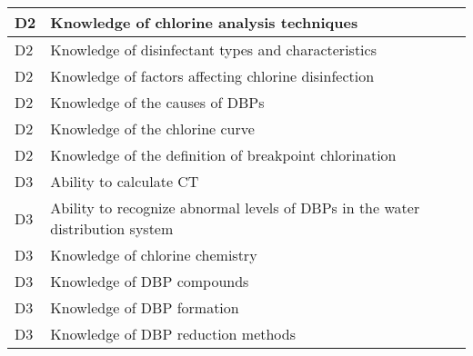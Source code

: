 \begin{table}[H]
\begin{tabular}{| m{1cm} | m{15cm} |}
D2 & Knowledge of chlorine   analysis techniques                                          \\ \hline
D2 & Knowledge of   disinfectant types and characteristics                                \\ \hline
D2 & Knowledge of factors   affecting chlorine disinfection                               \\ \hline
D2 & Knowledge of the   causes of DBPs                                                    \\ \hline
D2 & Knowledge of the   chlorine curve                                                    \\ \hline
D2 & Knowledge of the   definition of breakpoint chlorination                             \\ \hline
D3 & Ability to calculate   CT                                                            \\ \hline
D3 & Ability to recognize   abnormal levels of DBPs in the water distribution system      \\ \hline
D3 & Knowledge of chlorine   chemistry                                                    \\ \hline
D3 & Knowledge of DBP   compounds                                                         \\ \hline
D3 & Knowledge of DBP   formation                                                         \\ \hline
D3 & Knowledge of DBP   reduction methods                                                 \\ \hline

\end{tabular}
\end{table}

\newpage




